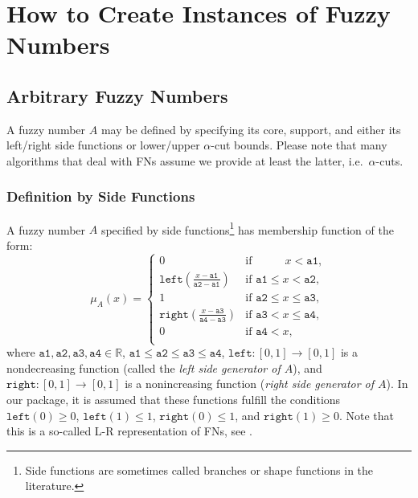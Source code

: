 \documentclass[11pt]{article}\usepackage[]{graphicx}\usepackage[]{color}
\begin{document}





\section{How to Create Instances of Fuzzy Numbers}


\subsection{Arbitrary Fuzzy Numbers}

A fuzzy number $A$ may be defined by specifying
its core, support, and either its left/right side functions
or lower/upper $\alpha$-cut bounds. Please note that many algorithms that
deal with FNs assume we provide at least the latter, i.e.~$\alpha$-cuts.

\subsubsection{Definition by Side Functions}

A fuzzy number $A$ specified by side functions\footnote{Side functions
  are sometimes called branches or shape functions in the literature.}
has membership function of the form:
\begin{equation}
\mu_A(x) = \left\{\begin{array}{ll}
0 & \text{if } \phantom{\mathtt{a2}\le\ } x<\mathtt{a1}, \\
\mathtt{left}\left( \frac{x-\mathtt{a1}}{\mathtt{a2-a1}} \right)  & \text{if } \mathtt{a1} \le x < \mathtt{a2}, \\
1 & \text{if } \mathtt{a2}\le x\le\mathtt{a3}, \\
\mathtt{right}\left( \frac{x-\mathtt{a3}}{\mathtt{a4-a3}} \right)  & \text{if } \mathtt{a3} < x \le \mathtt{a4}, \\
0 & \text{if } \mathtt{a4}<x, \\
\end{array}\right.
\end{equation}
where $\mathtt{a1},\mathtt{a2},\mathtt{a3},\mathtt{a4}\in\mathbb{R}$,
$\mathtt{a1}\le\mathtt{a2}\le\mathtt{a3}\le\mathtt{a4}$,
$\mathtt{left}: [0,1]\to[0,1]$ is a nondecreasing function
(called the \textit{left side generator of $A$}),
and $\mathtt{right}: [0,1]\to[0,1]$ is a nonincreasing function
(\textit{right side generator of $A$}).
In our package, it is assumed that these functions fulfill the conditions
$\mathtt{left}(0)\ge 0$, $\mathtt{left}(1)\le 1$,
$\mathtt{right}(0)\le 1$, and $\mathtt{right}(1)\ge 0$.
Note that this is a so-called L-R representation of FNs,
see \cite{DuboisPrade1987:fnoverview}.
\end{document}
